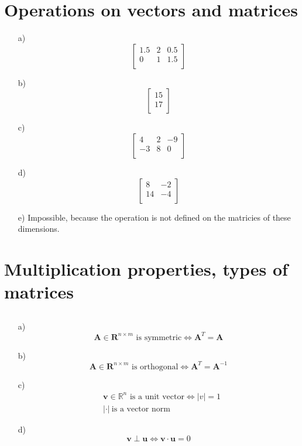 \documentclass{article}
\begin{document}
\pagebreak

\section{Operations on vectors and matrices}

\begin{itemize}
\item[a)]
$$
    \begin{bmatrix} 
    1.5 & 2 & 0.5 \\
    0   & 1 & 1.5 \\
    \end{bmatrix}
$$
\item[b)]
$$
    \begin{bmatrix} 
    15 \\
    17 \\
    \end{bmatrix}
$$
\item[c)]
$$
    \begin{bmatrix} 
    4 & 2 & -9 \\
    -3 & 8 & 0 \\
    \end{bmatrix}
$$
\item[d)]
$$
    \begin{bmatrix} 
    8 & -2 \\
    14 & -4 \\
    \end{bmatrix}
$$
\item[e)] Impossible, because the operation is not defined on the matricies of these dimensions.
\end{itemize}

\section{Multiplication properties, types of matrices}

\subsection{}

\begin{itemize}
\item[a)]
$$
\mathbf{A} \in \mathbf{R}^{n\times m} \text{ is symmetric} \Leftrightarrow \mathbf{A}^T = \mathbf{A}
$$

\item[b)]
$$
\mathbf{A} \in \mathbf{R}^{n\times m} \text{ is orthogonal} \Leftrightarrow \mathbf{A}^T = \mathbf{A}^{-1}
$$

\item[c)]
\begin{align*}
& \mathbf{v} \in \mathbb{R}^n \text{ is a unit vector} \Leftrightarrow |v| = 1\\
& |\cdot|\ \text{is a vector norm}
\end{align*}

\item[d)]
$$
\mathbf{v} \perp \mathbf{u} \Leftrightarrow \mathbf{v} \cdot \mathbf{u} = 0
$$

\end{itemize}
\end{document}
